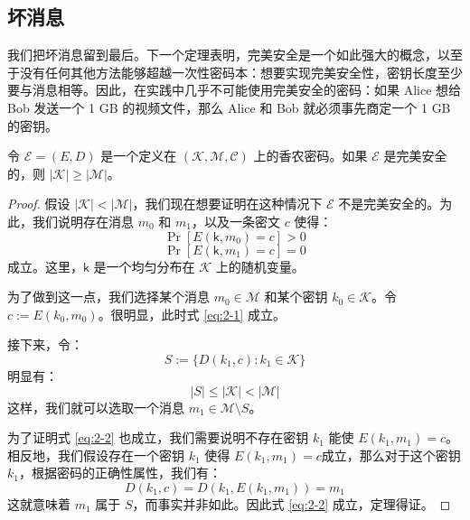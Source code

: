 \subsection{坏消息}

我们把坏消息留到最后。下一个定理表明，完美安全是一个如此强大的概念，以至于没有任何其他方法能够超越一次性密码本：想要实现完美安全性，密钥长度至少要与消息相等。因此，在实践中几乎不可能使用完美安全的密码：如果 Alice 想给 Bob 发送一个 1 GB 的视频文件，那么 Alice 和 Bob 就必须事先商定一个 1 GB 的密钥。

\begin{theorem}[香农定理]\label{theo:2-5}
令 $\mathcal{E}=(E,D)$ 是一个定义在 $(\mathcal{K},\mathcal{M},\mathcal{C})$ 上的香农密码。如果 $\mathcal{E}$ 是完美安全的，则 $|\mathcal{K}|\geq|\mathcal{M}|$。
\end{theorem}

\begin{proof}
假设 $|\mathcal{K}|<|\mathcal{M}|$，我们现在想要证明在这种情况下 $\mathcal{E}$ 不是完美安全的。为此，我们说明存在消息 $m_0$ 和 $m_1$，以及一条密文 $c$ 使得：
\begin{equation}\label{eq:2-1}
\Pr[E(\mathsf{k},m_0)=c]>0
\end{equation}
\begin{equation}\label{eq:2-2}
\Pr[E(\mathsf{k},m_1)=c]=0
\end{equation}
成立。这里，$\mathsf{k}$ 是一个均匀分布在 $\mathcal{K}$ 上的随机变量。

为了做到这一点，我们选择某个消息 $m_0\in\mathcal{M}$ 和某个密钥 $k_0\in\mathcal{K}$。令 $c:=E(k_0,m_0)$。很明显，此时式 \ref{eq:2-1} 成立。

接下来，令：
\[
S:=\{D(k_1,c):k_1\in\mathcal{K}\}
\]
明显有：
\[
|S|\leq|\mathcal{K}|<|\mathcal{M}|
\]
这样，我们就可以选取一个消息 $m_1\in \mathcal{M}\setminus S$。

为了证明式 \ref{eq:2-2} 也成立，我们需要说明不存在密钥 $k_1$ 能使 $E(k_1,m_1) = c$。相反地，我们假设存在一个密钥 $k_1$ 使得 $E(k_1,m_1) = c$成立，那么对于这个密钥 $k_1$，根据密码的正确性属性，我们有：
\[
D(k_1,c)=D(k_1,E(k_1,m_1))=m_1
\]
这就意味着 $m_1$ 属于 $S$，而事实并非如此。因此式 \ref{eq:2-2} 成立，定理得证。
\end{proof}